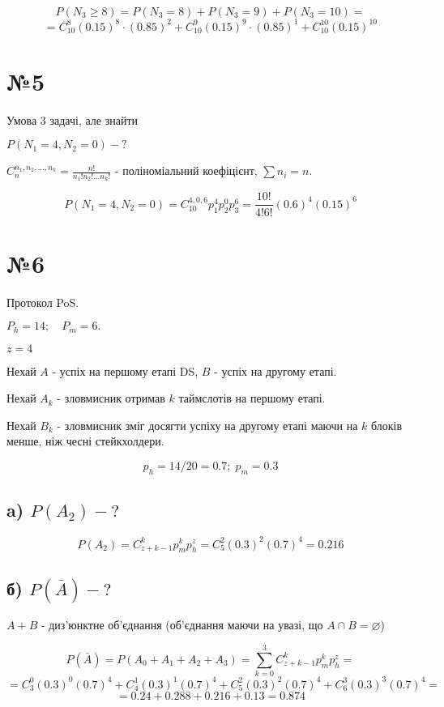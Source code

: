 \documentclass[11pt, a4paper]{article} %
\begin{document}
\[P(N_3 \ge 8) = P(N_3 = 8) + P(N_3 = 9) + P(N_3 = 10) = \]
\[ = C_{10}^8 (0.15)^8 \cdot (0.85)^2 + C_{10}^9 (0.15)^9 \cdot (0.85)^1 + C_{10}^10 (0.15)^10 \]

\section*{№5}
\begin{mdframed}
    Умова 3 задачі, але знайти
    
    $P(N_1 = 4, N_2 = 0) - ?$
    \end{mdframed}

$C_n^{n_1,n_2,...,n_k} = \frac{n!}{n_1!n_2!...n_k!}$ - поліноміальний коефіцієнт, $\sum n_i = n$.

\[P(N_1 = 4, N_2 = 0) = C_{10}^{4,0,6} p_1^4 p_2^0 p_3^6 = \frac{10!}{4!6!} (0.6)^4(0.15)^6\]

\section*{№6}

\begin{mdframed}
    Протокол PoS.

    $P_h = 14; \quad P_m = 6.$

    $z = 4$
\end{mdframed}

Нехай $A$ - успіх на першому етапі DS, $B$ - успіх на другому етапі.

Нехай $A_k$ - зловмисник отримав $k$ таймслотів на першому етапі. 

Нехай $B_k$ - зловмисник зміг досягти успіху на другому етапі маючи на $k$ блоків менше, ніж чесні стейкхолдери.

\[p_h = 14/20 = 0.7; \; p_m = 0.3\]


\subsection*{a) $P(A_2) - ?$}
\[P(A_2) = C_{z+k-1}^k p_m^k p_h^z = C_{5}^2 (0.3)^2 (0.7)^4 = 0.216\]

\subsection*{б) $P(\bar A) - ?$}

$A+B$ - диз'юнктне об'єднання (об'єднання маючи на увазі, що $A\cap B = \varnothing$)

\[P(\bar A) = P(A_0 + A_1 + A_2 + A_3) = \sum_{k=0}^3 C_{z+k-1}^k p_m^k p_h^z = \]
\[= C_{3}^0 (0.3)^0 (0.7)^4 + C_{4}^1 (0.3)^1 (0.7)^4 + C_{5}^2 (0.3)^2 (0.7)^4 + C_{6}^3 (0.3)^3 (0.7)^4 = \]
\[= 0.24 + 0.288 + 0.216 + 0.13 = 0.874\]
\end{document}
